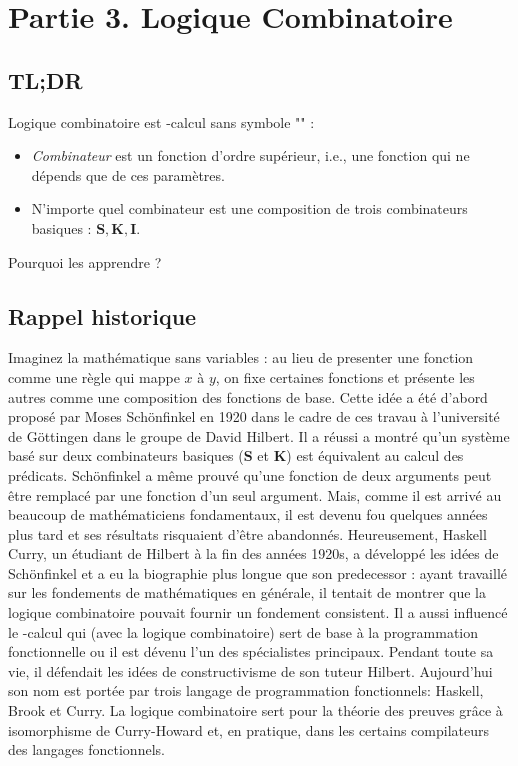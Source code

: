 \section*{Partie 3. Logique Combinatoire}

%
%
%
%
%
%
%
%

\subsection*{TL;DR}

Logique combinatoire est \lam -calcul sans symbole "\lam " :
\begin{itemize}
	\item \emph{Combinateur} est un fonction d'ordre supérieur, i.e., une fonction qui ne dépends que de ces paramètres.
	\item N'importe quel combinateur est une composition de trois combinateurs basiques : $\mathbf{S}, \mathbf{K}, \mathbf{I}$.
\end{itemize}
Pourquoi les apprendre ?

\subsection*{Rappel historique}

Imaginez la mathématique sans variables : au lieu de presenter une fonction comme une règle qui mappe $x$ à $y$, on fixe certaines fonctions et présente les autres comme une composition des fonctions de base. Cette idée a été d'abord proposé par Moses Schönfinkel en 1920 dans le cadre de ces travau à l'université de Göttingen dans le groupe de David Hilbert. Il a réussi a montré qu'un système basé sur deux combinateurs basiques ($\mathbf{S}$ et $\mathbf{K}$) est équivalent au calcul des prédicats. Schönfinkel a même prouvé qu'une fonction de deux arguments peut être remplacé par une fonction d'un seul argument. Mais, comme il est arrivé au beaucoup de mathématiciens fondamentaux, il est devenu fou quelques années plus tard et ses résultats risquaient d'être abandonnés. Heureusement, Haskell Curry, un étudiant de Hilbert à la fin des années 1920s, a développé les idées de Schönfinkel et a eu la biographie plus longue que son predecessor : ayant travaillé sur les fondements de mathématiques en générale, il tentait de montrer que la logique combinatoire pouvait fournir un fondement consistent. Il a aussi influencé le \lam -calcul qui (avec la logique combinatoire) sert de base à la programmation fonctionnelle ou il est dévenu l'un des spécialistes principaux. Pendant toute sa vie, il défendait les idées de constructivisme de son tuteur Hilbert.
Aujourd'hui son nom est portée par trois langage de programmation fonctionnels: Haskell, Brook et Curry.
La logique combinatoire sert pour la théorie des preuves grâce à isomorphisme de Curry-Howard et, en pratique, dans les certains compilateurs des langages fonctionnels.

